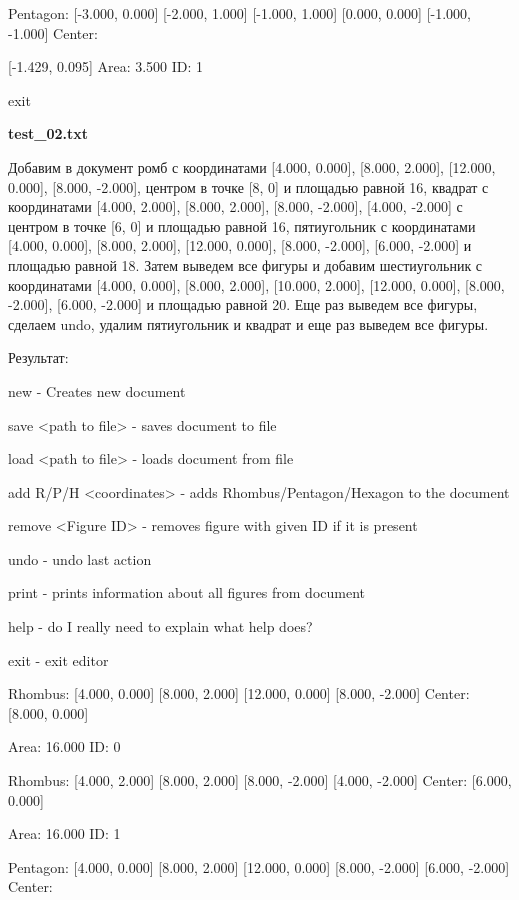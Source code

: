 \documentclass[a4paper, 12pt]{article}
\begin{document}
Pentagon: [-3.000, 0.000] [-2.000, 1.000] [-1.000, 1.000] [0.000, 0.000] [-1.000, -1.000] Center: 

[-1.429, 0.095] Area: 3.500 ID: 1

exit






\vspace{3ex}

\textbf{test\_02.txt} 

Добавим в документ ромб с координатами [4.000, 0.000], [8.000, 2.000], [12.000, 0.000], [8.000, -2.000], центром в точке [8, 0] и площадью равной 16, квадрат с координатами [4.000, 2.000], [8.000, 2.000], [8.000, -2.000], [4.000, -2.000] с центром в точке [6, 0] и площадью равной 16, пятиугольник с координатами [4.000, 0.000], [8.000, 2.000], [12.000, 0.000], [8.000, -2.000], [6.000, -2.000] и площадью равной 18. Затем выведем все фигуры и добавим шестиугольник с координатами [4.000, 0.000], [8.000, 2.000], [10.000, 2.000], [12.000, 0.000], [8.000, -2.000], [6.000, -2.000] и площадью равной 20. Еще раз выведем все фигуры, сделаем undo, удалим пятиугольник и квадрат и еще раз выведем все фигуры.

Результат:

new - Creates new document

save <path to file> - saves document to file

load <path to file> - loads document from file

add R/P/H <coordinates> - adds Rhombus/Pentagon/Hexagon to the document

remove <Figure ID> - removes figure with given ID if it is present

undo - undo last action

print - prints information about all figures from document

help - do I really need to explain what help does?

exit - exit editor

Rhombus: [4.000, 0.000] [8.000, 2.000] [12.000, 0.000] [8.000, -2.000] Center: [8.000, 0.000] 

Area: 16.000 ID: 0

Rhombus: [4.000, 2.000] [8.000, 2.000] [8.000, -2.000] [4.000, -2.000] Center: [6.000, 0.000] 

Area: 16.000 ID: 1

Pentagon: [4.000, 0.000] [8.000, 2.000] [12.000, 0.000] [8.000, -2.000] [6.000, -2.000] Center: 
\end{document}
